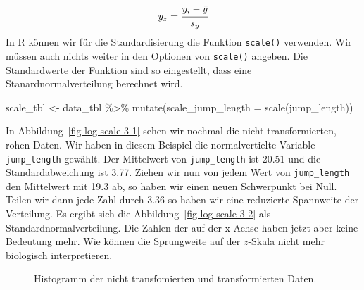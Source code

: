 \documentclass[
  letterpaper,
]{scrbook}
\newenvironment{Shaded}{\begin{snugshade}}{\end{snugshade}}
\newcommand{\AttributeTok}[1]{\textcolor[rgb]{0.40,0.45,0.13}{#1}}
\newcommand{\FunctionTok}[1]{\textcolor[rgb]{0.28,0.35,0.67}{#1}}
\newcommand{\NormalTok}[1]{\textcolor[rgb]{0.00,0.23,0.31}{#1}}
\newcommand{\OtherTok}[1]{\textcolor[rgb]{0.00,0.23,0.31}{#1}}
\newcommand{\SpecialCharTok}[1]{\textcolor[rgb]{0.37,0.37,0.37}{#1}}
\begin{document}
\[
y_z = \cfrac{y_i - \bar{y}}{s_y} 
\] In R können wir für die Standardisierung die Funktion
\texttt{scale()} verwenden. Wir müssen auch nichts weiter in den
Optionen von \texttt{scale()} angeben. Die Standardwerte der Funktion
sind so eingestellt, dass eine Stanardnormalverteilung berechnet wird.

\begin{Shaded}
\begin{Highlighting}[]
\NormalTok{scale\_tbl }\OtherTok{\textless{}{-}}\NormalTok{ data\_tbl }\SpecialCharTok{\%\textgreater{}\%} 
  \FunctionTok{mutate}\NormalTok{(}\AttributeTok{scale\_jump\_length =} \FunctionTok{scale}\NormalTok{(jump\_length))}
\end{Highlighting}
\end{Shaded}

In Abbildung~\ref{fig-log-scale-3-1} sehen wir nochmal die nicht
transformierten, rohen Daten. Wir haben in diesem Beispiel die
normalvertielte Variable \texttt{jump\_length} gewählt. Der Mittelwert
von \texttt{jump\_length} ist 20.51 und die Standardabweichung ist 3.77.
Ziehen wir nun von jedem Wert von \texttt{jump\_length} den Mittelwert
mit 19.3 ab, so haben wir einen neuen Schwerpunkt bei Null. Teilen wir
dann jede Zahl durch 3.36 so haben wir eine reduzierte Spannweite der
Verteilung. Es ergibt sich die Abbildung~\ref{fig-log-scale-3-2} als
Standardnormalverteilung. Die Zahlen der auf der x-Achse haben jetzt
aber keine Bedeutung mehr. Wie können die Sprungweite auf der
\(z\)-Skala nicht mehr biologisch interpretieren.

\begin{figure}

\begin{minipage}[t]{0.50\linewidth}

{\centering 


}

\end{minipage}%
%
\begin{minipage}[t]{0.50\linewidth}

{\centering 


}

\end{minipage}%

\caption{\label{fig-log-scale-3}Histogramm der nicht transfomierten und
transformierten Daten.}

\end{figure}
\end{document}
